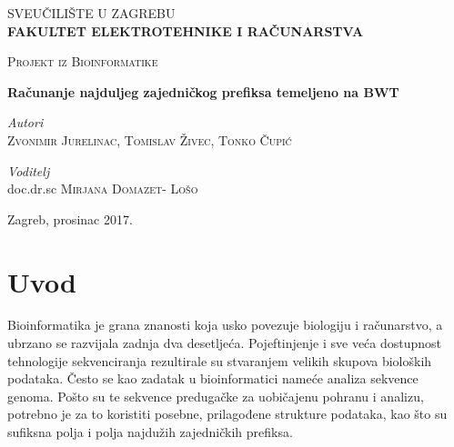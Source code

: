 \documentclass[a4paper,12pt]{article}
\begin{document}
\begin{titlepage}
	\center
	
	\textsc{\Large SVEUČILIŠTE U ZAGREBU}\\
	\vspace{0.4cm}
	\textsc{\Large \textbf{FAKULTET ELEKTROTEHNIKE I RAČUNARSTVA}}
	\vspace{2.5cm}
	\vfill\vfill
    
	\textsc{\Large Projekt iz Bioinformatike}
	\vspace{0.5cm}
	
	{\huge\bfseries Računanje najduljeg zajedničkog prefiksa temeljeno na BWT}
	\vspace{1.2cm}
	
	\begin{minipage}{2.5\textwidth}
		\begin{flushleft}
			\large
			\textit{Autori}\\
			\textsc{Zvonimir Jurelinac, Tomislav Živec, Tonko Čupić}
		\end{flushleft}
	\end{minipage}

	\vspace{0.3cm}

	\begin{minipage}{2.5\textwidth}
		\begin{flushleft}
			\large
			\textit{Voditelj}\\
			doc.dr.sc \textsc{Mirjana Domazet- Lošo}
		\end{flushleft}
	\end{minipage}
	
	\vfill\vfill\vfill\vfill
	{\large Zagreb, prosinac 2017.}
		
\end{titlepage}

\newpage

\tableofcontents
\newpage

\section{Uvod}

Bioinformatika je grana znanosti koja usko povezuje biologiju i računarstvo, a ubrzano se razvijala zadnja dva desetljeća. Pojeftinjenje i sve veća dostupnost tehnologije sekvenciranja rezultirale su stvaranjem velikih skupova bioloških podataka. Često se kao zadatak u bioinformatici nameće analiza sekvence genoma. Pošto su te sekvence predugačke za uobičajenu pohranu i analizu, potrebno je za to koristiti posebne, prilagođene strukture podataka, kao što su sufiksna polja i polja najdužih zajedničkih prefiksa. 
\end{document}
